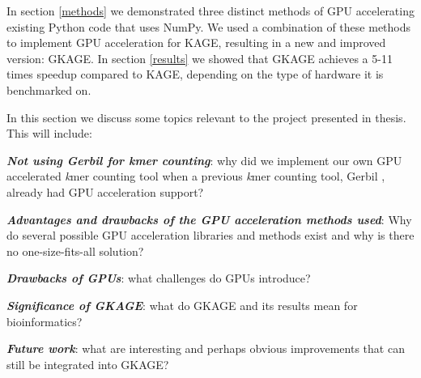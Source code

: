 In section \ref{methods} we demonstrated three distinct methods of GPU accelerating existing Python code that uses NumPy.
We used a combination of these methods to implement GPU acceleration for KAGE, resulting in a new and improved version: GKAGE.
In section \ref{results} we showed that GKAGE achieves a 5-11 times speedup compared to KAGE, depending on the type of hardware it is benchmarked on.

In this section we discuss some topics relevant to the project presented in thesis.
This will include:
\begin{compactitem}
  \item
    \textit{\textbf{Not using Gerbil for kmer counting}}: why did we implement our own GPU accelerated \textit{k}mer counting tool when a previous \textit{k}mer counting tool, Gerbil \cite{gerbil}, already had GPU acceleration support?
  \item
    \textit{\textbf{Advantages and drawbacks of the GPU acceleration methods used}}: Why do several possible GPU acceleration libraries and methods exist and why is there no one-size-fits-all solution?
  \item
    \textit{\textbf{Drawbacks of GPUs}}: what challenges do GPUs introduce?
  \item
    \textit{\textbf{Significance of GKAGE}}: what do GKAGE and its results mean for bioinformatics?
  \item
    \textit{\textbf{Future work}}: what are interesting and perhaps obvious improvements that can still be integrated into GKAGE?
\end{compactitem}
